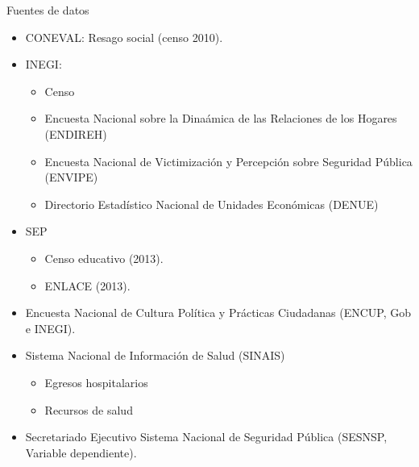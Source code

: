 \documentclass[ignorenonframetext,]{beamer}
\begin{document}
\begin{frame}{Fuentes de datos}

\begin{itemize}
\itemsep1pt\parskip0pt
\item
  CONEVAL: Resago social (censo 2010).
\item
  INEGI:

  \begin{itemize}
  \itemsep1pt\parskip0pt
  \item
    Censo
  \item
    Encuesta Nacional sobre la Dinaámica de las Relaciones de los
    Hogares (ENDIREH)
  \item
    Encuesta Nacional de Victimización y Percepción sobre Seguridad
    Pública (ENVIPE)
  \item
    Directorio Estadístico Nacional de Unidades Económicas (DENUE)
  \end{itemize}
\item
  SEP

  \begin{itemize}
  \itemsep1pt\parskip0pt
  \item
    Censo educativo (2013).
  \item
    ENLACE (2013).
  \end{itemize}
\item
  Encuesta Nacional de Cultura Política y Prácticas Ciudadanas (ENCUP,
  Gob e INEGI).
\item
  Sistema Nacional de Información de Salud (SINAIS)

  \begin{itemize}
  \itemsep1pt\parskip0pt
  \item
    Egresos hospitalarios
  \item
    Recursos de salud
  \end{itemize}
\item
  Secretariado Ejecutivo Sistema Nacional de Seguridad Pública (SESNSP,
  Variable dependiente).
\end{itemize}

\end{frame}
\end{document}
